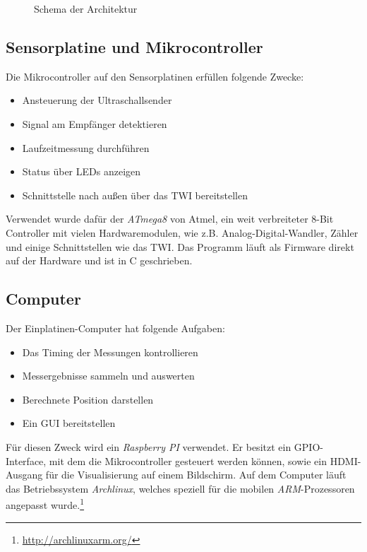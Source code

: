 \begin{figure}[H]
\caption{Schema der Architektur} \label{fig:ARCH}
\end{figure}


\subsection{Sensorplatine und Mikrocontroller}
Die Mikrocontroller auf den Sensorplatinen erfüllen folgende Zwecke:
\begin{itemize}
	\item Ansteuerung der Ultraschallsender
	\item Signal am Empfänger detektieren
	\item Laufzeitmessung durchführen
	\item Status über \ac{LED}s anzeigen
	\item Schnittstelle nach außen über das \ac{TWI} bereitstellen
\end{itemize}
Verwendet wurde dafür der \textit{ATmega8} von Atmel, ein weit verbreiteter 8-Bit Controller mit vielen Hardwaremodulen, wie z.B. Analog-Digital-Wandler, Zähler und einige Schnittstellen wie das \ac{TWI}. Das Programm läuft als Firmware direkt auf der Hardware und ist in C geschrieben.


\subsection{Computer}
Der Einplatinen-Computer hat folgende Aufgaben:
\begin{itemize}
	\item Das Timing der Messungen kontrollieren
	\item Messergebnisse sammeln und auswerten
	\item Berechnete Position darstellen
	\item Ein \ac{GUI} bereitstellen %
\end{itemize}
Für diesen Zweck wird ein \textit{Raspberry PI} verwendet. Er besitzt ein \ac{GPIO}-Interface, mit dem die Mikrocontroller gesteuert werden können, sowie ein \ac{HDMI}-Ausgang für die Visualisierung auf einem Bildschirm. Auf dem Computer läuft das Betriebssystem \textit{Archlinux}, welches speziell für die mobilen \textit{ARM}-Prozessoren angepasst wurde.\footnote{\url{http://archlinuxarm.org/}}



